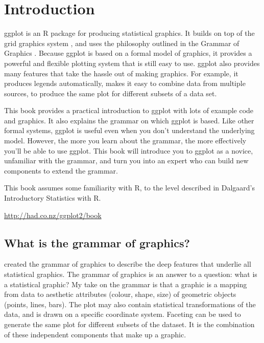 

\chapter{Introduction}

ggplot is an R package for producing statistical graphics.  It builds on top of the grid graphics system \citep{grid}, and uses the philosophy outlined in the Grammar of Graphics \citep{wilkinson:2006}.  Because ggplot is based on a formal model of graphics, it provides a powerful and flexible plotting system that is still easy to use.  ggplot also provides many features that take the hassle out of making graphics. For example, it produces legends automatically, makes it easy to combine data from multiple sources, to produce the same plot for different subsets of a data set.

This book provides a practical introduction to ggplot with lots of example code and graphics. It also explains the grammar on which ggplot is based. Like other formal systems, ggplot is useful even when you don't understand the underlying model. However, the more you learn about the grammar, the more effectively you'll be able to use ggplot. This book will introduce you to ggplot as a novice, unfamiliar with the grammar, and turn you into an expert who can build new components to extend the grammar.

This book assumes some familiarity with R, to the level described in Dalgaard’s Introductory Statistics with R.

\url{http://had.co.nz/ggplot2/book}

\section{What is the grammar of graphics?}

\citet{wilkinson:2006} created the grammar of graphics to describe the deep features that underlie all statistical graphics.  The grammar of graphics is an answer to a question: what is a statistical graphic?  My take on the grammar is that a graphic is a mapping from data to  aesthetic attributes (colour, shape, size) of geometric objects (points, lines, bars).  The plot may also contain statistical transformations of the data, and is drawn on a specific  coordinate system.  Faceting can be used to generate the same plot for different subsets of the dataset.  It is the combination of these independent components that make up a graphic.  

